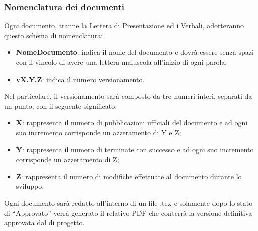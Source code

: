 \subsubsection{Nomenclatura dei documenti}
Ogni documento, tranne la Lettera di Presentazione ed i Verbali, adotteranno questo schema di nomenclatura:
\begin{itemize}
    \item \textbf{NomeDocumento}: indica il nome del documento e dovrà essere senza spazi con il vincolo di avere una lettera maiuscola all’inizio di ogni parola;
    \item \textbf{vX.Y.Z}: indica il numero versionamento.
\end{itemize}
Nel particolare, il versionamento sarà composto da tre numeri interi, separati da un punto, con il seguente significato:
\begin{itemize}
    \item \textbf{X}: rappresenta il numero di pubblicazioni ufficiali del documento e ad ogni suo incremento corrisponde un azzeramento di Y e Z;
    \item \textbf{Y}: rappresenta il numero di  terminate con successo e ad ogni suo incremento corrisponde un azzeramento di Z;
    \item \textbf{Z}: rappresenta il numero di modifiche effettuate al documento durante lo sviluppo.
\end{itemize}
Ogni documento sarà redatto all’interno di un file .tex e solamente dopo lo stato di “Approvato” verrà generato il relativo PDF che conterrà la versione definitiva approvata dal \emph{} di progetto.

